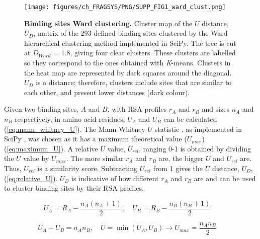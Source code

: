 \begin{figure}[htb!]
    \centering
    \texttt{[image: figures/ch\_FRAGSYS/PNG/SUPP\_FIG1\_ward\_clust.png]}
    \caption[Binding sites Ward clustering]{\textbf{Binding sites Ward clustering.} Cluster map of the $U$ distance, $U_{D}$, matrix of the 293 defined binding sites clustered by the Ward hierarchical clustering method implemented in SciPy. The tree is cut at $D_{Ward}$ = 1.8, giving four clear clusters. These clusters are labelled so they correspond to the ones obtained with \textit{K}-means. Clusters in the heat map are represented by dark squares around the diagonal. $U_{D}$ is a distance; therefore, clusters include sites that are similar to each other, and present lower distances (dark colour).}
    \label{fig:fragsys_bs_clust_ward}
\end{figure}

Given two binding sites, $A$ and $B$, with RSA profiles $r_{A}$ and $r_{B}$ and sizes $n_{A}$ and $n_{B}$ respectively, in amino acid residues, $U_{A}$ and $U_{B}$ can be calculated (\autoref{eq:mann_whitney_U}). The Mann-Whitney $U$ statistic \cite{MANN_WHITNEY_1947_TEST}, as implemented in SciPy \cite{VIRTANEN_2020_SCIPY}, was chosen as it has a maximum theoretical value ($U_{max}$) (\autoref{eq:maximum_U}). A relative $U$ value, $U_{rel}$, ranging 0-1 is obtained by dividing the $U$ value by $U_{max}$. The more similar $r_{A}$ and $r_{B}$ are, the bigger $U$ and $U_{rel}$ are. Thus, $U_{rel}$ is a similarity score. Subtracting $U_{rel}$ from 1 gives the $U$ distance, $U_{D}$, (\autoref{eq:relative_U}). $U_{D}$ is indicative of how different $r_{A}$ and $r_{B}$ are and can be used to cluster binding sites by their RSA profiles.

\begin{equation}
U_A = R_A - \frac{n_A(n_A + 1)}{2}, \quad U_B = R_B - \frac{n_B(n_B + 1)}{2} \quad
\label{eq:mann_whitney_U}
\end{equation}

\vspace{-31pt} %

\begin{equation}
U_A + U_B = n_A n_B, \quad U = \min(U_A, U_B) \rightarrow U_{max} = \frac{n_A n_B}{2} \quad
\label{eq:maximum_U} 
\end{equation}

\vspace{-31pt} %

